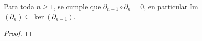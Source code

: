 \begin{ejercicio}\label{ej:53}
	Para toda $n\geq 1$, se cumple que $\partial_{n-1}\circ\partial_{n}=0$, en particular Im$(\partial_n)\subseteq\ker(\partial_{n-1})$.
\end{ejercicio}
\begin{proof}%

\end{proof}%

